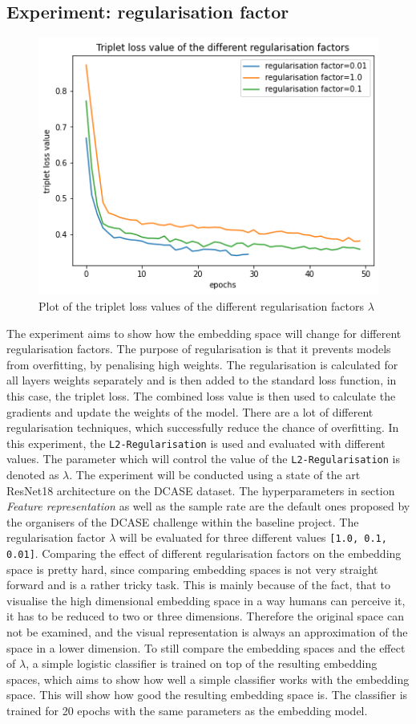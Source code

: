 \subsection{Experiment: regularisation factor}
\label{sub:Experiment-Regularisation-Factor}
\begin{figure}[ht]
\centering
    \includegraphics[width=0.5\linewidth]{study-doc/experiment_regularisation/assets/triplet_loss.png}
    \caption{Plot of the triplet loss values of the different regularisation factors $\lambda$}
    \label{fig:plot-triplet-loss}
\end{figure}
\noindent
The experiment aims to show how the embedding space will change for different regularisation factors. The purpose of regularisation is that it prevents models from overfitting, by penalising high weights. The regularisation is calculated for all layers weights separately and is then added to the standard loss function, in this case, the triplet loss. The combined loss value is then used to calculate the gradients and update the weights of the model. There are a lot of different regularisation techniques, which successfully reduce the chance of overfitting. In this experiment, the \texttt{L2-Regularisation} is used and evaluated with different values. The parameter which will control the value of the \texttt{L2-Regularisation} is denoted as $\lambda$.
\newline
\newline
The experiment will be conducted using a state of the art ResNet18 architecture on the \gls{DCASE} dataset. The hyperparameters in section \textit{Feature representation} as well as the sample rate are the default ones proposed by the organisers of the \gls{DCASE} challenge within the baseline project. The regularisation factor $\lambda$ will be evaluated for three different values \texttt{[1.0, 0.1, 0.01]}.
\newline
\newline
Comparing the effect of different regularisation factors on the embedding space is pretty hard, since comparing embedding spaces is not very straight forward and is a rather tricky task. This is mainly because of the fact, that to visualise the high dimensional embedding space in a way humans can perceive it, it has to be reduced to two or three dimensions. Therefore the original space can not be examined, and the visual representation is always an approximation of the space in a lower dimension. To still compare the embedding spaces and the effect of $\lambda$, a simple logistic classifier is trained on top of the resulting embedding spaces, which aims to show how well a simple classifier works with the embedding space. This will show how good the resulting embedding space is. The classifier is trained for 20 epochs with the same parameters as the embedding model.
